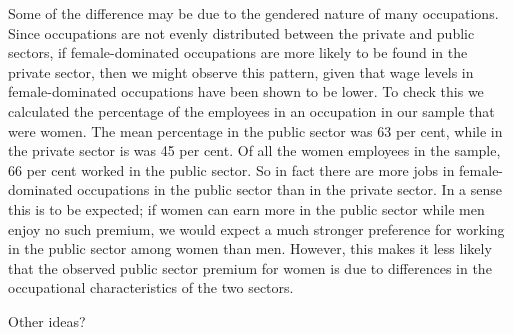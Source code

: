 \documentclass[a4paper,11pt,titlepage]{article}
\begin{document}
Some of the difference may be due to the gendered nature of many occupations.  Since occupations are not evenly distributed between the private and public sectors, if female-dominated occupations are more likely to be found in the private sector, then we might observe this pattern, given that wage levels in female-dominated occupations have been shown to be lower.  To check this we calculated the percentage of the employees in an occupation in our sample that were women.  The mean percentage in the public sector was 63 per cent, while in the private sector is was 45 per cent. Of all the women employees in the sample, 66 per cent worked in the public sector.  So in fact there are more jobs in female-dominated occupations in the public sector than in the private sector.  In a sense this is to be expected; if women can earn more in the public sector while men enjoy no such premium, we would expect a much stronger preference for working in the public sector among women than men.  However, this makes it less likely that the observed public sector premium for women is due to differences in the occupational characteristics of the two sectors.

\begin{db}
Other ideas?
\end{db}

\clearpage

\end{document}
